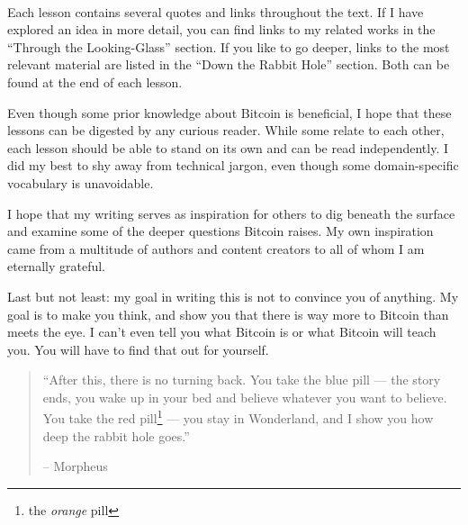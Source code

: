 ~

Each lesson contains several quotes and links throughout the text. If I have
explored an idea in more detail, you can find links to my related works in the
``Through the Looking-Glass'' section. If you like to go deeper, links to the most
relevant material are listed in the ``Down the Rabbit Hole'' section. Both can be
found at the end of each lesson.

Even though some prior knowledge about Bitcoin is beneficial, I hope that these
lessons can be digested by any curious reader. While some relate to each other,
each lesson should be able to stand on its own and can be read independently. I
did my best to shy away from technical jargon, even though some domain-specific
vocabulary is unavoidable.

I hope that my writing serves as inspiration for others to dig beneath the
surface and examine some of the deeper questions Bitcoin raises. My own
inspiration came from a multitude of authors and content creators to all of whom
I am eternally grateful.

Last but not least: my goal in writing this is not to convince you of anything.
My goal is to make you think, and show you that there is way more to Bitcoin
than meets the eye. I can’t even tell you what Bitcoin is or what Bitcoin will
teach you. You will have to find that out for yourself.

\begin{quotation}
``After this, there is no turning back. You take the blue pill --- the
story ends, you wake up in your bed and believe whatever you want to
believe. You take the red pill\footnote{the \textit{orange} pill} --- you stay in Wonderland, and I show
you how deep the rabbit hole goes.''
\begin{flushright}
-- Morpheus
\end{flushright}
\end{quotation}

